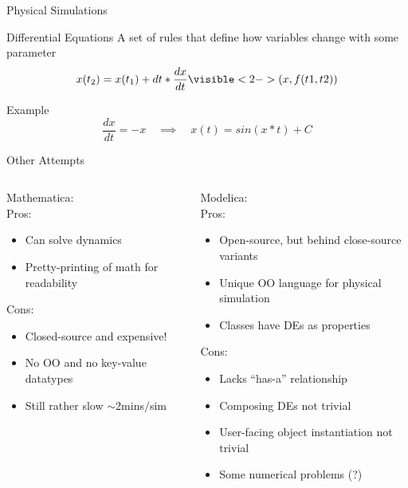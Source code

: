 \documentclass[mathserif]{beamer}
\begin{document}
\begin{frame}{Physical Simulations}
  \begin{block}{Differential Equations}
    A set of rules that define how variables change with some parameter
    \begin{equation*}
      x(t_2) = x(t_1) + dt*\frac{dx}{dt}\visible<2->{(x,f(t1,t2))}
    \end{equation*}
  \end{block}
  \begin{block}{Example}
    \begin{equation*}
      \frac{dx}{dt} = -x \quad\implies\quad x(t) = sin(x*t) + C
    \end{equation*}
  \end{block}
\end{frame}

\begin{frame}{Other Attempts}
  \begin{columns}
    \begin{column}{0.49\linewidth}
      Mathematica:\\
      Pros:
      \begin{itemize}
        \item Can solve dynamics
        \item Pretty-printing of math for readability
      \end{itemize}
      Cons:
      \begin{itemize}
        \item Closed-source and expensive!
        \item No OO and no key-value datatypes
        \item Still rather slow $\sim$2mins$/$sim
      \end{itemize}
    \end{column}
    \begin{column}{0.49\linewidth}
      Modelica:\\
      Pros:
      \begin{itemize}
        \item Open-source, but behind close-source variants
        \item Unique OO language for physical simulation
        \item Classes have DEs as properties
      \end{itemize}
      Cons:
      \begin{itemize}
        \item Lacks ``has-a'' relationship
        \item Composing DEs not trivial
        \item User-facing object instantiation not trivial
        \item Some numerical problems (?)
      \end{itemize}
    \end{column}
  \end{columns}
\end{frame}
\end{document}
